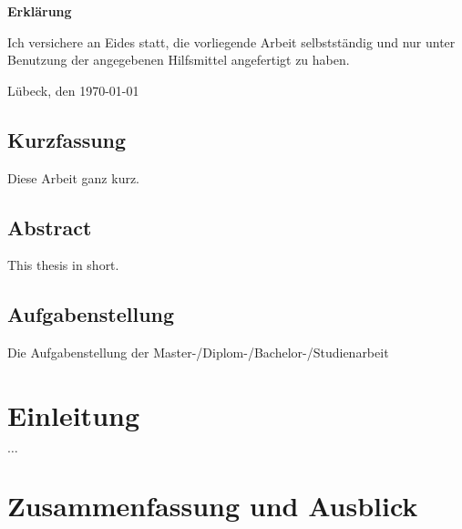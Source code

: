 \documentclass[11pt,twoside,a4paper,BCOR8.25mm,DIV10,headsepline,footsepline]{scrbook}
\begin{document}
	\restoregeometry

	\cleardoublepage

	\newpage
	\vspace*{7cm}
	\centerline{\bf Erklärung}

	\vspace*{1cm}
	Ich versichere an Eides statt, die vorliegende Arbeit selbstständig und nur unter Benutzung
	der angegebenen Hilfsmittel angefertigt zu haben.

	\vspace*{3cm}
	Lübeck, den \today 

	\pagestyle{headings}

	\cleardoublepage


	\section*{Kurzfassung}

	Diese Arbeit ganz kurz.

	\vskip 3cm

	\section*{Abstract}

	This thesis in short.

	\cleardoublepage


	\section*{Aufgabenstellung}

	Die Aufgabenstellung der Master-/Diplom-/Bachelor-/Studienarbeit

	\tableofcontents
	\cleardoublepage

	\mainmatter
	\pagestyle{fancy}
	
	\chapter{Einleitung}
	\label{cha:einleitung}

	$\dots$

	\chapter{Zusammenfassung und Ausblick}
	\label{cha:zusammenfassung}
\end{document}
